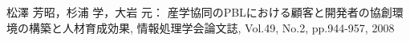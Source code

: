 \documentclass[a4j,9pt,twoside,twocolumn]{jsarticle}
\newcommand{\me}{中鉢 欣秀}
\begin{document}
\begin{thebibliography}{99}
		 松澤 芳昭，杉浦 学，大岩 元： 産学協同のPBLにおける顧客と開発者の協創環境の構築と人材育成効果, 情報処理学会論文誌,  Vol.49, No.2, pp.944-957, 2008
	\end{thebibliography}

\newpage %
\end{document}
